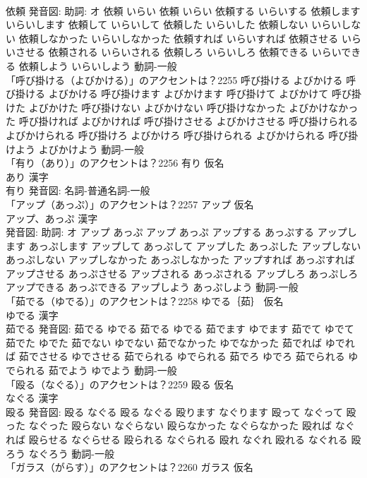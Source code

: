 \documentclass[8pt]{extreport}
\begin{document}
\begin{CJK}{UTF8}{min}
\\	依頼 発音図: 助詞: オ	依頼 いらい		依頼 いらい 依頼する いらいする 依頼します いらいします 依頼して いらいして 依頼した いらいした 依頼しない いらいしない 依頼しなかった いらいしなかった 依頼すれば いらいすれば 依頼させる いらいさせる 依頼される いらいされる 依頼しろ いらいしろ 依頼できる いらいできる 依頼しよう いらいしよう				動詞-一般 
\\	「呼び掛ける（よびかける）」のアクセントは？2255		呼び掛ける よびかける		呼び掛ける よびかける 呼び掛けます よびかけます 呼び掛けて よびかけて 呼び掛けた よびかけた 呼び掛けない よびかけない 呼び掛けなかった よびかけなかった 呼び掛ければ よびかければ 呼び掛けさせる よびかけさせる 呼び掛けられる よびかけられる 呼び掛けろ よびかけろ 呼び掛けられる よびかけられる 呼び掛けよう よびかけよう				動詞-一般 
\\	「有り（あり）」のアクセントは？2256	有り 仮名　
\\	あり 漢字　
\\	有り 発音図:							名詞-普通名詞-一般 
\\	「アップ（あっぷ）」のアクセントは？2257	アップ 仮名　
\\	アップ、あっぷ 漢字　
\\	発音図: 助詞: オ	アップ あっぷ		アップ あっぷ アップする あっぷする アップします あっぷします アップして あっぷして アップした あっぷした アップしない あっぷしない アップしなかった あっぷしなかった アップすれば あっぷすれば アップさせる あっぷさせる アップされる あっぷされる アップしろ あっぷしろ アップできる あっぷできる アップしよう あっぷしよう				動詞-一般 
\\	「茹でる（ゆでる）」のアクセントは？2258	ゆでる｛茹｝ 仮名　
\\	ゆでる 漢字　
\\	茹でる 発音図:	茹でる ゆでる		茹でる ゆでる 茹でます ゆでます 茹でて ゆでて 茹でた ゆでた 茹でない ゆでない 茹でなかった ゆでなかった 茹でれば ゆでれば 茹でさせる ゆでさせる 茹でられる ゆでられる 茹でろ ゆでろ 茹でられる ゆでられる 茹でよう ゆでよう				動詞-一般 
\\	「殴る（なぐる）」のアクセントは？2259	殴る 仮名　
\\	なぐる 漢字　
\\	殴る 発音図:	殴る なぐる		殴る なぐる 殴ります なぐります 殴って なぐって 殴った なぐった 殴らない なぐらない 殴らなかった なぐらなかった 殴れば なぐれば 殴らせる なぐらせる 殴られる なぐられる 殴れ なぐれ 殴れる なぐれる 殴ろう なぐろう				動詞-一般 
\\	「ガラス（がらす）」のアクセントは？2260	ガラス 仮名　

\end{CJK}
\end{document}
